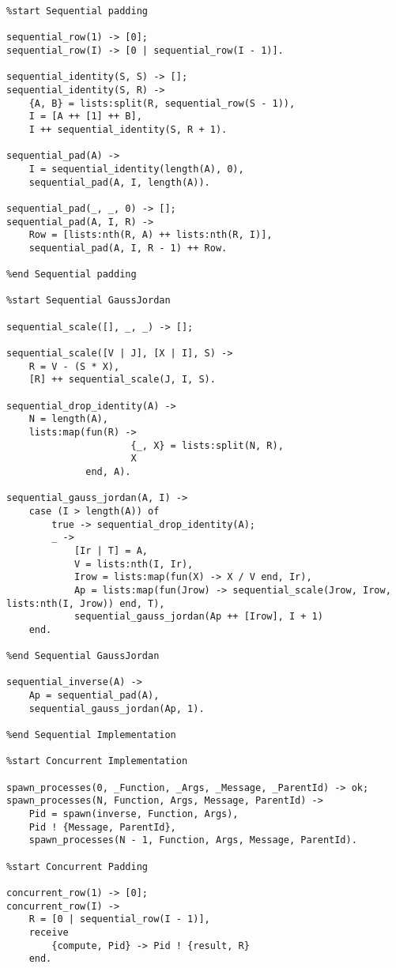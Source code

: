 \documentclass[10pt,letterpaper,oneside]{article}
\begin{document}
{\begin{verbatim}
%start Sequential padding

sequential_row(1) -> [0];
sequential_row(I) -> [0 | sequential_row(I - 1)].

sequential_identity(S, S) -> [];
sequential_identity(S, R) -> 
    {A, B} = lists:split(R, sequential_row(S - 1)),
    I = [A ++ [1] ++ B],
    I ++ sequential_identity(S, R + 1).

sequential_pad(A) ->
    I = sequential_identity(length(A), 0),
    sequential_pad(A, I, length(A)).

sequential_pad(_, _, 0) -> [];
sequential_pad(A, I, R) ->
    Row = [lists:nth(R, A) ++ lists:nth(R, I)],
    sequential_pad(A, I, R - 1) ++ Row.

%end Sequential padding

%start Sequential GaussJordan

sequential_scale([], _, _) -> [];

sequential_scale([V | J], [X | I], S) ->
    R = V - (S * X),
    [R] ++ sequential_scale(J, I, S).

sequential_drop_identity(A) ->
    N = length(A),
    lists:map(fun(R) ->
                      {_, X} = lists:split(N, R),
                      X
              end, A).

sequential_gauss_jordan(A, I) ->
    case (I > length(A)) of
        true -> sequential_drop_identity(A);
        _ ->
            [Ir | T] = A,
            V = lists:nth(I, Ir),
            Irow = lists:map(fun(X) -> X / V end, Ir),
            Ap = lists:map(fun(Jrow) -> sequential_scale(Jrow, Irow, lists:nth(I, Jrow)) end, T),
            sequential_gauss_jordan(Ap ++ [Irow], I + 1)
    end.

%end Sequential GaussJordan

sequential_inverse(A) ->
    Ap = sequential_pad(A),
    sequential_gauss_jordan(Ap, 1).

%end Sequential Implementation 

%start Concurrent Implementation

spawn_processes(0, _Function, _Args, _Message, _ParentId) -> ok;
spawn_processes(N, Function, Args, Message, ParentId) ->
    Pid = spawn(inverse, Function, Args),
    Pid ! {Message, ParentId},
    spawn_processes(N - 1, Function, Args, Message, ParentId).

%start Concurrent Padding

concurrent_row(1) -> [0];
concurrent_row(I) -> 
    R = [0 | sequential_row(I - 1)],
    receive
        {compute, Pid} -> Pid ! {result, R}
    end.


\end{verbatim}}
\end{document}
